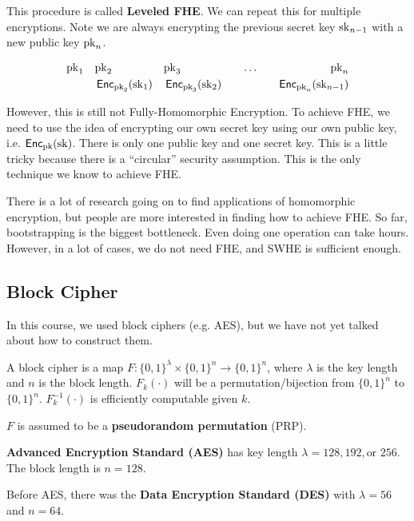\begin{center}
    \def\svgwidth{0.7\columnwidth}
    
\end{center}

This procedure is called \textbf{Leveled FHE}. We can repeat this for multiple encryptions. Note we are always encrypting the previous secret key $\mathrm{sk}_{n-1}$ with a new public key $\mathrm{pk}_n$.

\begin{align*}
    \mathrm{pk}_1 \quad & \mathrm{pk}_2  && \mathrm{pk}_3 &&& \dots &&&& \mathrm{pk}_n\\
    & \operatorname{\mathsf{Enc}}_{\mathrm{pk}_2}(\mathrm{sk}_1) && \operatorname{\mathsf{Enc}}_{\mathrm{pk}_3}(\mathrm{sk}_2) &&& &&&& \operatorname{\mathsf{Enc}}_{\mathrm{pk}_n}(\mathrm{sk}_{n-1})
\end{align*}

However, this is still not Fully-Homomorphic Encryption. To achieve FHE, we need to use the idea of encrypting our own secret key using our own public key, i.e. $\operatorname{\mathsf{Enc}}_{\mathrm{pk}}(\mathrm{sk})$. There is only one public key and one secret key. This is a little tricky because there is a ``circular'' security assumption. This is the only technique we know to achieve FHE.

There is a lot of research going on to find applications of homomorphic encryption, but people are more interested in finding how to achieve FHE. So far, bootstrapping is the biggest bottleneck. Even doing one operation can take hours. However, in a lot of cases, we do not need FHE, and SWHE is sufficient enough.

\subsection{Block Cipher}

In this course, we used block ciphers (e.g. AES), but we have not yet talked about how to construct them.

\begin{definition}
    A block cipher is a map $F: \{0, 1\} ^\lambda \times \{ 0 , 1\} ^n \to \{ 0, 1 \}^n$, where $\lambda$ is the key length and $n$ is the block length. $F_k(\cdot)$ will be a permutation/bijection from $\{0, 1\}^n$ to $\{0, 1\}^n$. $F_k^{-1}(\cdot)$ is efficiently computable given $k$.
    
    $F$ is assumed to be a \textbf{pseudorandom permutation} (PRP).
\end{definition}

\begin{example}
    \textbf{Advanced Encryption Standard (AES)} has key length $\lambda = 128, 192, \text{or }256$. The block length is $n=128$.
    
    Before AES, there was the \textbf{Data Encryption Standard (DES)} with $\lambda = 56$ and $n =64$.
\end{example}

